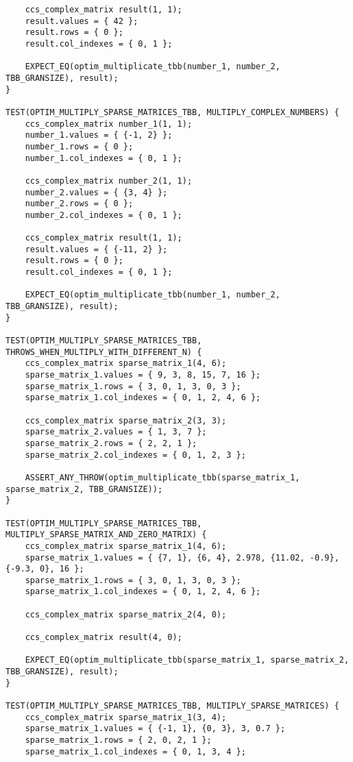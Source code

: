 \documentclass{report}
\begin{document}
\begin{itemize}
\begin{itemize}
\begin{lstlisting}
    ccs_complex_matrix result(1, 1);
    result.values = { 42 };
    result.rows = { 0 };
    result.col_indexes = { 0, 1 };

    EXPECT_EQ(optim_multiplicate_tbb(number_1, number_2, TBB_GRANSIZE), result);
}

TEST(OPTIM_MULTIPLY_SPARSE_MATRICES_TBB, MULTIPLY_COMPLEX_NUMBERS) {
    ccs_complex_matrix number_1(1, 1);
    number_1.values = { {-1, 2} };
    number_1.rows = { 0 };
    number_1.col_indexes = { 0, 1 };

    ccs_complex_matrix number_2(1, 1);
    number_2.values = { {3, 4} };
    number_2.rows = { 0 };
    number_2.col_indexes = { 0, 1 };

    ccs_complex_matrix result(1, 1);
    result.values = { {-11, 2} };
    result.rows = { 0 };
    result.col_indexes = { 0, 1 };

    EXPECT_EQ(optim_multiplicate_tbb(number_1, number_2, TBB_GRANSIZE), result);
}

TEST(OPTIM_MULTIPLY_SPARSE_MATRICES_TBB, THROWS_WHEN_MULTIPLY_WITH_DIFFERENT_N) {
    ccs_complex_matrix sparse_matrix_1(4, 6);
    sparse_matrix_1.values = { 9, 3, 8, 15, 7, 16 };
    sparse_matrix_1.rows = { 3, 0, 1, 3, 0, 3 };
    sparse_matrix_1.col_indexes = { 0, 1, 2, 4, 6 };

    ccs_complex_matrix sparse_matrix_2(3, 3);
    sparse_matrix_2.values = { 1, 3, 7 };
    sparse_matrix_2.rows = { 2, 2, 1 };
    sparse_matrix_2.col_indexes = { 0, 1, 2, 3 };

    ASSERT_ANY_THROW(optim_multiplicate_tbb(sparse_matrix_1, sparse_matrix_2, TBB_GRANSIZE));
}

TEST(OPTIM_MULTIPLY_SPARSE_MATRICES_TBB, MULTIPLY_SPARSE_MATRIX_AND_ZERO_MATRIX) {
    ccs_complex_matrix sparse_matrix_1(4, 6);
    sparse_matrix_1.values = { {7, 1}, {6, 4}, 2.978, {11.02, -0.9}, {-9.3, 0}, 16 };
    sparse_matrix_1.rows = { 3, 0, 1, 3, 0, 3 };
    sparse_matrix_1.col_indexes = { 0, 1, 2, 4, 6 };

    ccs_complex_matrix sparse_matrix_2(4, 0);

    ccs_complex_matrix result(4, 0);

    EXPECT_EQ(optim_multiplicate_tbb(sparse_matrix_1, sparse_matrix_2, TBB_GRANSIZE), result);
}

TEST(OPTIM_MULTIPLY_SPARSE_MATRICES_TBB, MULTIPLY_SPARSE_MATRICES) {
    ccs_complex_matrix sparse_matrix_1(3, 4);
    sparse_matrix_1.values = { {-1, 1}, {0, 3}, 3, 0.7 };
    sparse_matrix_1.rows = { 2, 0, 2, 1 };
    sparse_matrix_1.col_indexes = { 0, 1, 3, 4 };


\end{lstlisting}
\end{itemize}
\end{itemize}
\end{document}
